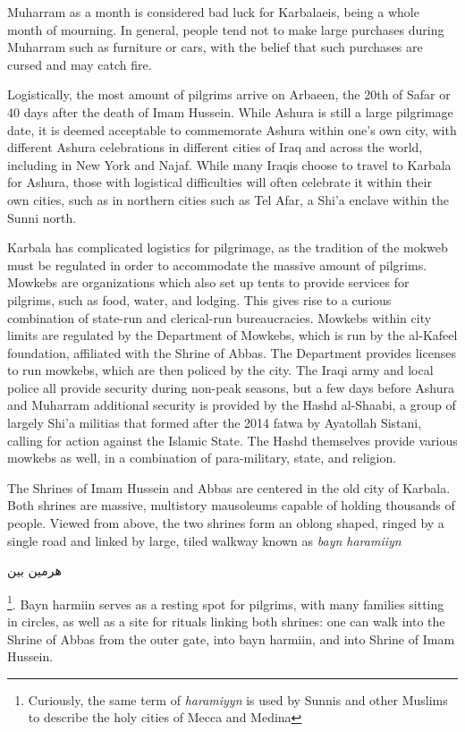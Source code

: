 
Muharram as a month is considered bad luck for Karbalaeis, being a whole month of mourning. In general, people tend not to make large purchases during Muharram such as furniture or cars, with the belief that such purchases are cursed and may catch fire. 

Logistically, the most amount of pilgrims arrive on Arbaeen, the 20th of Safar or 40 days after the death of Imam Hussein. While Ashura is still a large pilgrimage date, it is deemed acceptable to commemorate Ashura within one’s own city, with different Ashura celebrations in different cities of Iraq and across the world, including in New York\cite{noauthor_festival_nodate} and Najaf. While many Iraqis choose to travel to Karbala for Ashura, those with logistical difficulties will often celebrate it within their own cities, such as in northern cities such as Tel Afar, a Shi'a enclave within the Sunni north.  

Karbala has complicated logistics for pilgrimage, as the tradition of the mokweb must be regulated in order to accommodate the massive amount of pilgrims. Mowkebs are organizations which also set up tents to provide services for pilgrims, such as food, water, and lodging. This gives rise to a curious combination of state-run and clerical-run bureaucracies. Mowkebs within city limits are regulated by the Department of Mowkebs, which is run by the al-Kafeel foundation, affiliated with the Shrine of Abbas. The Department provides licenses to run mowkebs, which are then policed by the city. The Iraqi army and local police all provide security during non-peak seasons, but a few days before Ashura and Muharram additional security is provided by the Hashd al-Shaabi, a group of largely Shi'a militias that formed after the 2014 fatwa by Ayatollah Sistani, calling for action against the Islamic State. The Hashd themselves provide various mowkebs as well, in a combination of para-military, state, and religion. 

The Shrines of Imam Hussein and Abbas are centered in the old city of Karbala. Both shrines are massive, multistory mausoleums capable of holding thousands of people. Viewed from above, the two shrines form an oblong shaped, ringed by a single road and linked by large, tiled walkway known as \emph{bayn haramiiyn}\begin{Arabic}هرمين بين\end{Arabic}\footnote{Curiously, the same term of \emph{haramiyyn} is used by Sunnis and other Muslims to describe the holy cities of Mecca and Medina}. Bayn harmiin serves as a resting spot for pilgrims, with many families sitting in circles, as well as a site for rituals linking both shrines: one can walk into the Shrine of Abbas from the outer gate, into bayn harmiin, and into Shrine of Imam Hussein. 

